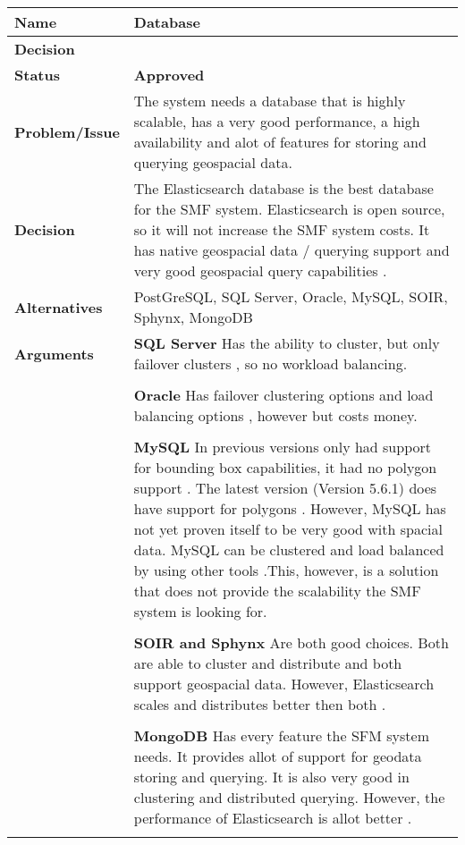\begin{table}[H]
	\begin{tabular}{L{0.2\textwidth} L{0.6\textwidth}}
		\textbf{Name} 			& \textbf{Database} \\ \toprule
		\textbf{Decision} 		&  \\ \midrule \midrule
		\textbf{Status} 		& \textbf{Approved} \\ \midrule
		\textbf{Problem/Issue} 	& The system needs a database that is highly scalable, has a very good performance, a high availability and alot of features for storing and querying geospacial data. \\
		\midrule
		\textbf{Decision} 		&  The Elasticsearch database is the best database for the SMF system. Elasticsearch is open source, so it will not increase the SMF system costs.  It has native geospacial data / querying support \cite{elasticgeo} and very good geospacial query capabilities \cite{elasticgeoquery}. \\ \midrule
		\textbf{Alternatives} 	& PostGreSQL, SQL Server, Oracle, MySQL, SOIR, Sphynx, MongoDB\\ \midrule
		\textbf{Arguments} 		&
			\textbf{SQL Server} Has the ability to cluster, but only failover clusters \cite{sqlserverdo}, so no workload balancing. \\\\
			& \textbf{Oracle} Has failover clustering options and load balancing options \cite{oracleworkload}, however but costs money.\\\\
			& \textbf{MySQL} In previous versions only had support for bounding box capabilities, it had no polygon support \cite{mysqlspacial}. The latest version (Version 5.6.1) does have support for polygons \cite{mysqlspacial}. However, MySQL has not yet proven itself to be very good with spacial data. MySQL can be clustered and load balanced by using other tools \cite{mysqlcluster}.This, however, is a solution that does not provide the scalability the SMF system is looking for. \\\\
			& \textbf{SOIR and Sphynx} Are both good choices. Both are able to cluster and distribute and both support geospacial data. However, Elasticsearch scales and distributes better then both \cite{elasticsearchcreator}.\\\\
			& \textbf{MongoDB} Has every feature the SFM system needs. It provides allot of support for geodata storing and querying. It is also very good in clustering and distributed querying. However, the performance of Elasticsearch is allot better \cite{mongovselastic}.\\\\

\end{tabular}
\end{table}
